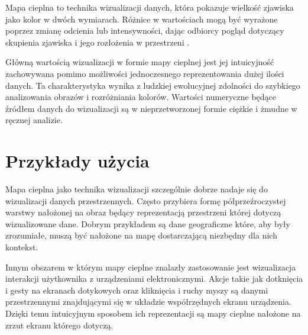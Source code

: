 Mapa cieplna to technika wizualizacji danych, która pokazuje wielkość zjawiska jako kolor w dwóch wymiarach. Różnice w wartościach mogą być wyrażone poprzez zmianę odcienia lub intensywności, dając odbiorcy pogląd dotyczący skupienia zjawiska i jego rozłożenia w przestrzeni \cite{Heat_map_definition}.

Główną wartością wizualizacji w formie mapy cieplnej jest jej intuicyjność zachowywana pomimo możliwości jednoczesnego reprezentowania dużej ilości danych. Ta charakterystyka wynika z ludzkiej ewolucyjnej zdolności do szybkiego analizowania obrazów i rozróżniania kolorów. Wartości numeryczne będące źródłem danych do wizualizacji są w nieprzetworzonej formie ciężkie i żmudne w ręcznej analizie.

\section{Przykłady użycia}
Mapa cieplna jako technika wizualizacji szczególnie dobrze nadaje się do wizualizacji danych przestrzennych. Często przybiera formę półprzeźroczystej warstwy nałożonej na obraz będący reprezentacją przestrzeni której dotyczą wizualizowane dane. Dobrym przykładem są dane geograficzne które, aby były zrozumiałe, muszą być nałożone na mapę dostarczającą niezbędny dla nich kontekst.


Innym obszarem w którym mapy cieplne znalazły zastosowanie jest wizualizacja interakcji użytkownika z urządzeniami elektronicznymi. Akcje takie jak dotknięcia i gesty na ekranach dotykowych oraz kliknięcia i ruchy myszy są danymi przestrzennymi znajdującymi się w układzie współrzędnych ekranu urządzenia. Dzięki temu intuicyjnym  sposobem ich reprezentacji są mapy cieplne nałożone na zrzut ekranu którego dotyczą.

